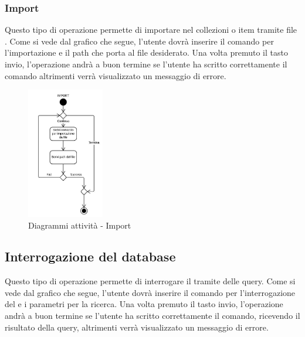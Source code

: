 \documentclass{scalatekids-article}
\begin{document}
\subsubsection{Import}

Questo tipo di operazione permette di importare nel  collezioni o item
tramite file . Come si vede dal grafico che segue, l'utente dovrà
inserire il comando per l'importazione e il path che porta al file desiderato.
Una volta premuto il tasto invio, l'operazione andrà a buon termine se
l'utente ha scritto correttamente il comando altrimenti verrà visualizzato un
messaggio di errore.

\begin{figure}[H]
  \begin{center}
    \includegraphics[width=0.3\textwidth, keepaspectratio]{img/diagrammiAttivita/import.jpeg}
    \caption{Diagrammi attività - Import}
  \end{center}
\end{figure}

\subsection{Interrogazione del database}

Questo tipo di operazione permette di interrogare il  tramite delle
query. Come si vede dal grafico che segue, l'utente dovrà inserire il comando
per l'interrogazione del  e i parametri per la ricerca. Una volta
premuto il tasto invio, l'operazione andrà a buon termine se l'utente ha
scritto correttamente il comando, ricevendo il risultato della query,
altrimenti verrà visualizzato un messaggio di errore.
\end{document}
